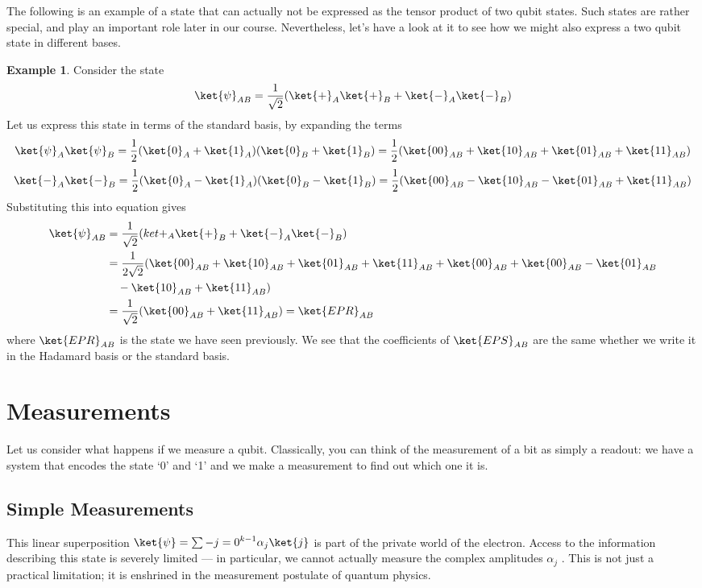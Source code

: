 \documentclass[12pt, oneside]{book}
\theoremstyle{definition}
\theoremstyle{definition}
\newtheorem{example}{Example}[section]
\theoremstyle{remark}
\begin{document}
The following is an example of a state that can actually not be expressed as the tensor product
of two qubit states. Such states are rather special, and play an important role later in our course.
Nevertheless, let’s have a look at it to see how we might also express a two qubit state in different
bases.
\begin{example}
    Consider the state
    \[
    \ket{\psi}_{AB}=\frac{1}{\sqrt{2}}(\ket{+}_A\ket{+}_B+\ket{-}_A\ket{-}_B)
    \]
    Let us express this state in terms of the standard basis, by expanding the terms
    \[
    \ket{\psi}_A\ket{\psi}_B=\frac{1}{2}(\ket{0}_A+\ket{1}_A)(\ket{0}_B+\ket{1}_B)=\frac{1}{2}(\ket{00}_{AB}+\ket{10}_{AB}+\ket{01}_{AB}+\ket{11}_{AB})
    \]
    \[
    \ket{-}_A\ket{-}_B=\frac{1}{2}(\ket{0}_A-\ket{1}_A)(\ket{0}_B-\ket{1}_B)=\frac{1}{2}(\ket{00}_{AB}-\ket{10}_{AB}-\ket{01}_{AB}+\ket{11}_{AB})
    \]
    Substituting this into equation gives
    \begin{align*}
    \ket{\psi}_{AB}&=\frac{1}{\sqrt{2}}(ket{+}_A\ket{+}_B+\ket{-}_A\ket{-}_B)\\
    &=\frac{1}{2\sqrt{2}}(\ket{00}_{AB}+\ket{10}_{AB}+\ket{01}_{AB}+\ket{11}_{AB}+\ket{00}_{AB}+\ket{00}_{AB}-\ket{01}_{AB}\\
    &\quad -\ket{10}_{AB}+\ket{11}_{AB})\\
    &=\frac{1}{\sqrt{2}}(\ket{00}_{AB}+\ket{11}_{AB})=\ket{EPR}_{AB}
    \end{align*}
    where $\ket{EPR}_{AB}$ is the state we have seen previously. We see that the coefficients of $\ket{EPS}_{AB}$ are the same whether we write it in the Hadamard basis or the standard basis.
\end{example}



\section{Measurements}
Let us consider what happens if we measure a qubit. Classically, you can think of the measurement
of a bit as simply a readout: we have a system that encodes the state ‘0’ and ‘1’ and we make a
measurement to find out which one it is.
\subsection{Simple Measurements}
This linear superposition $\ket{\psi}=\sum-{j=0}^{k-1}\alpha_j\ket{j}$ is part of the private world of the
electron. Access to the information describing this state is severely limited —
in particular, we cannot actually measure the complex amplitudes $\alpha_j$ . This is
not just a practical limitation; it is enshrined in the measurement postulate
of quantum physics.
\end{document}
